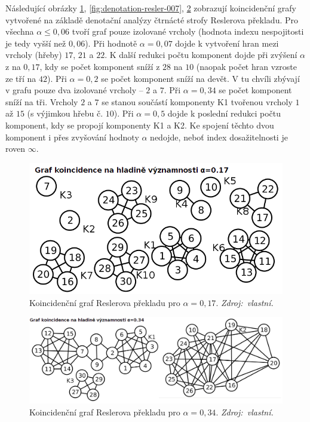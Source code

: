 \documentclass[dp.tex]{subfiles}
\begin{document}
Následující obrázky \ref{fig:denotation-resler-005}, \ref{fig:denotation-resler-007}, \ref{fig:denotation-resler-034}  zobrazují koincidenční grafy vytvořené na základě denotační analýzy čtrnácté strofy Reslerova překladu. Pro všechna $\alpha \leq 0{,}06$ tvoří graf pouze izolované vrcholy (hodnota indexu nespojitosti je tedy vyšší než $0{,}06$). Při hodnotě $\alpha = 0{,}07$ dojde k vytvoření hran mezi vrcholy (hřeby) $17$, $21$ a $22$. K další redukci počtu komponent dojde při zvýšení $\alpha$ z na $0{,}17$, kdy se počet komponent sníží z $28$ na $10$ (naopak počet hran vzroste ze tří na $42$). Při $\alpha = 0{,}2$ se počet komponent sníží na devět. V tu chvíli zbývají v grafu pouze dva izolované vrcholy -- $2$ a $7$. Při $\alpha = 0{,}34$ se počet komponent sníží na tři. Vrcholy $2$ a $7$ se stanou součástí komponenty K1 tvořenou vrcholy $1$ až $15$ (s výjimkou hřebu č. $10$). Při $\alpha = 0{,}5$ dojde k poslední redukci počtu komponent, kdy se propojí komponenty K1 a K2. Ke spojení těchto dvou komponent i přes zvyšování hodnoty $\alpha$ nedojde, neboť index dosažitelnosti je roven $\infty$.

\begin{figure}[H]
	\centering
	\includegraphics[max width=\textwidth,keepaspectratio=true]{imgs-70-prakticka/denotation-resler-017}
	\caption[Koincidenční graf Reslerova překladu pro $\alpha = 0{,}17$.]{Koincidenční graf Reslerova překladu pro $\alpha = 0{,}17$. \textit{Zdroj:~vlastní.}}
	\label{fig:denotation-resler-005}
\end{figure}

\begin{figure}[H]
	\centering
	\includegraphics[max width=\textwidth,keepaspectratio=true]{imgs-70-prakticka/denotation-resler-034}
	\caption[Koincidenční graf Reslerova překladu pro $\alpha = 0{,}34$.]{Koincidenční graf Reslerova překladu pro $\alpha = 0{,}34$. \textit{Zdroj:~vlastní.}}
	\label{fig:denotation-resler-034}
\end{figure}
\end{document}
